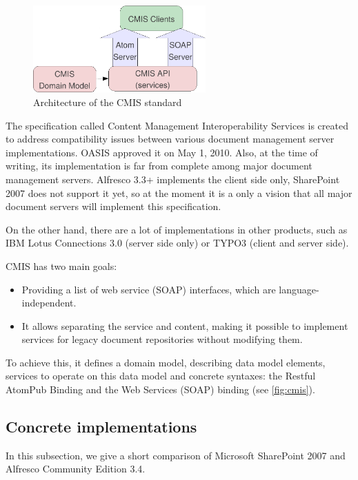 \begin{figure}[H]
\centering
\includegraphics[width=250px,keepaspectratio]{cmis.pdf}
\caption{Architecture of the CMIS standard}
\label{fig:cmis}
\end{figure}

The specification called Content Management Interoperability
Services \cite{cmis} is created to address compatibility issues between various
document management server implementations. OASIS approved it on May 1, 2010.
Also, at the time of writing, its implementation is far from complete among major
document management servers. Alfresco 3.3+ implements the client side only,
SharePoint 2007 does not support it yet, so at the moment it is a only a vision that
all major document servers will implement this specification.

On the other hand, there are a lot of implementations in other products, such
as IBM Lotus Connections 3.0 \cite{lotus} (server side only) or TYPO3 (client
and server side).

CMIS has two main goals:

\begin{itemize}
\item Providing a list of web service (SOAP) interfaces, which are language-independent.
\item It allows separating the service and content, making it possible to
implement services for legacy document repositories without modifying them.
\end{itemize}

To achieve this, it defines a domain model, describing data model elements,
services to operate on this data model and concrete syntaxes: the Restful
AtomPub Binding and the Web Services (SOAP) binding (see \autoref{fig:cmis}).

\subsection{Concrete implementations}

In this subsection, we give a short comparison of Microsoft SharePoint 2007 and
Alfresco Community Edition 3.4.

